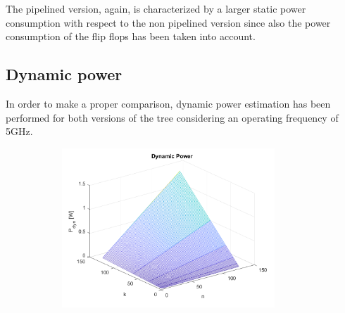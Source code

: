 The pipelined version, again, is characterized by a larger static power consumption with respect to the non pipelined version since also the power consumption of the flip flops has been taken into account. 


\subsection{Dynamic power}
In order to make a proper comparison, dynamic power estimation has been performed for both versions of the tree considering an operating frequency of 5GHz.
\begin{figure}[H]
	{
		\begin{subfigure}{0.55\textwidth}
			\includegraphics[width=8cm]{immagini/radix2ppipe0/p_dyn3D.png}

\end{subfigure}}
\end{figure}
